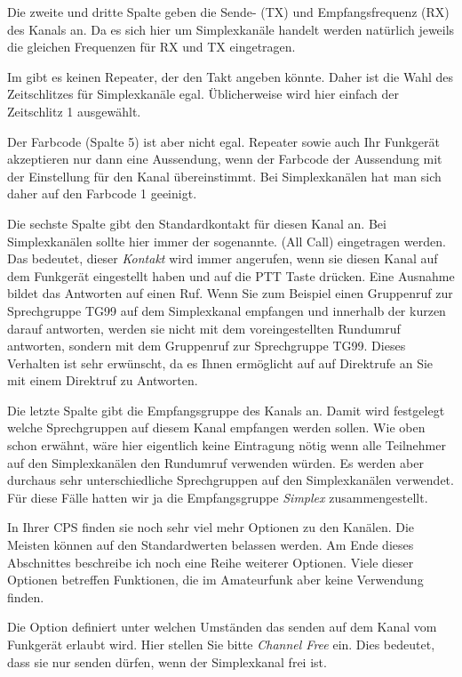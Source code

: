 Die zweite und dritte Spalte geben die Sende- (TX) und Empfangsfrequenz (RX) des Kanals an. Da es sich hier um Simplexkanäle handelt werden natürlich jeweils die gleichen Frequenzen für RX und TX eingetragen. 

Im  gibt es keinen Repeater, der den Takt angeben könnte. Daher ist die Wahl des Zeitschlitzes für Simplexkanäle egal. Üblicherweise wird hier einfach der Zeitschlitz 1 ausgewählt.

Der Farbcode (Spalte 5) ist aber nicht egal. Repeater sowie auch Ihr Funkgerät akzeptieren nur dann eine Aussendung, wenn der Farbcode der Aussendung mit der Einstellung für den Kanal übereinstimmt. Bei Simplexkanälen hat man sich daher auf den Farbcode 1 geeinigt. 

Die sechste Spalte gibt den Standardkontakt für diesen Kanal an. Bei Simplexkanälen sollte hier immer der sogenannte.  (All Call) eingetragen werden. Das bedeutet, dieser \emph{Kontakt} wird immer angerufen, wenn sie diesen Kanal auf dem Funkgerät eingestellt haben und auf die PTT Taste drücken. Eine Ausnahme bildet das Antworten auf einen Ruf. Wenn Sie zum Beispiel einen Gruppenruf zur Sprechgruppe TG99 auf dem Simplexkanal empfangen und innerhalb der kurzen  darauf antworten, werden sie nicht mit dem voreingestellten Rundumruf antworten, sondern mit dem Gruppenruf zur Sprechgruppe TG99. Dieses Verhalten ist sehr erwünscht, da es Ihnen ermöglicht auf auf Direktrufe an Sie mit einem Direktruf zu Antworten.  

Die letzte Spalte gibt die Empfangsgruppe des Kanals an. Damit wird festgelegt welche Sprechgruppen auf diesem Kanal empfangen werden sollen. Wie oben schon erwähnt, wäre hier eigentlich keine Eintragung nötig wenn alle Teilnehmer auf den Simplexkanälen den Rundumruf verwenden würden. Es werden aber durchaus sehr unterschiedliche Sprechgruppen auf den Simplexkanälen verwendet. Für diese Fälle hatten wir ja die Empfangsgruppe \emph{Simplex} zusammengestellt. 

In Ihrer CPS finden sie noch sehr viel mehr Optionen zu den Kanälen. Die Meisten können auf den Standardwerten belassen werden. Am Ende dieses Abschnittes beschreibe ich noch eine Reihe weiterer Optionen. Viele dieser Optionen betreffen Funktionen, die im Amateurfunk aber keine Verwendung finden. 

Die Option  definiert unter welchen Umständen das senden auf dem Kanal vom Funkgerät erlaubt wird. Hier stellen Sie bitte \emph{Channel Free} ein. Dies bedeutet, dass sie nur senden dürfen, wenn der Simplexkanal frei ist.  

